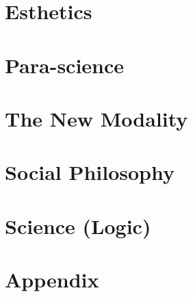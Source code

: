 \documentclass[10pt,twoside,draft,openany]{book}
\begin{document}
\part{Esthetics}
\pagestyle{salest}
\setheadrule{.4pt}




% 
% 

\part{Para-science}
\pagestyle{salps}
\setheadrule{.4pt}


% 


\part{The New Modality}
\pagestyle{salnm}
\setheadrule{.4pt}








\part{Social Philosophy}
\pagestyle{salsp}
\setheadrule{.4pt}




\part{Science (Logic)}
\pagestyle{salsci}
\setheadrule{.4pt}


% 
% 

\backmatter
\part{Appendix}
\pagestyle{salapp}
\setheadrule{.4pt}








\end{document}
